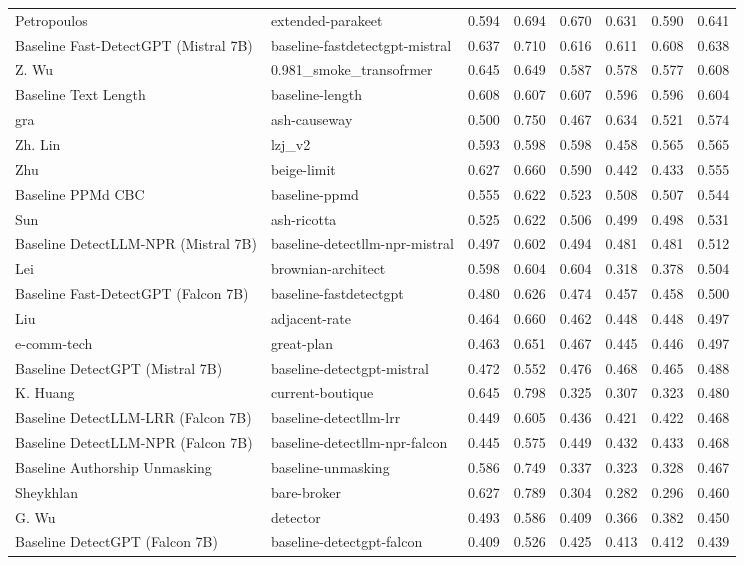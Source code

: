 \begin{tabular}{llrrrrrr}
Petropoulos & extended-parakeet & 0.594 & 0.694 & 0.670 & 0.631 & 0.590 & 0.641 \\
Baseline Fast-DetectGPT (Mistral 7B) & baseline-fastdetectgpt-mistral & 0.637 & 0.710 & 0.616 & 0.611 & 0.608 & 0.638 \\
Z. Wu & 0.981_smoke_transofrmer & 0.645 & 0.649 & 0.587 & 0.578 & 0.577 & 0.608 \\
Baseline Text Length & baseline-length & 0.608 & 0.607 & 0.607 & 0.596 & 0.596 & 0.604 \\
gra & ash-causeway & 0.500 & 0.750 & 0.467 & 0.634 & 0.521 & 0.574 \\
Zh. Lin & lzj_v2 & 0.593 & 0.598 & 0.598 & 0.458 & 0.565 & 0.565 \\
Zhu & beige-limit & 0.627 & 0.660 & 0.590 & 0.442 & 0.433 & 0.555 \\
Baseline PPMd CBC & baseline-ppmd & 0.555 & 0.622 & 0.523 & 0.508 & 0.507 & 0.544 \\
Sun & ash-ricotta & 0.525 & 0.622 & 0.506 & 0.499 & 0.498 & 0.531 \\
Baseline DetectLLM-NPR (Mistral 7B) & baseline-detectllm-npr-mistral & 0.497 & 0.602 & 0.494 & 0.481 & 0.481 & 0.512 \\
Lei & brownian-architect & 0.598 & 0.604 & 0.604 & 0.318 & 0.378 & 0.504 \\
Baseline Fast-DetectGPT (Falcon 7B) & baseline-fastdetectgpt & 0.480 & 0.626 & 0.474 & 0.457 & 0.458 & 0.500 \\
Liu & adjacent-rate & 0.464 & 0.660 & 0.462 & 0.448 & 0.448 & 0.497 \\
e-comm-tech & great-plan & 0.463 & 0.651 & 0.467 & 0.445 & 0.446 & 0.497 \\
Baseline DetectGPT (Mistral 7B) & baseline-detectgpt-mistral & 0.472 & 0.552 & 0.476 & 0.468 & 0.465 & 0.488 \\
K. Huang & current-boutique & 0.645 & 0.798 & 0.325 & 0.307 & 0.323 & 0.480 \\
Baseline DetectLLM-LRR (Falcon 7B) & baseline-detectllm-lrr & 0.449 & 0.605 & 0.436 & 0.421 & 0.422 & 0.468 \\
Baseline DetectLLM-NPR (Falcon 7B) & baseline-detectllm-npr-falcon & 0.445 & 0.575 & 0.449 & 0.432 & 0.433 & 0.468 \\
Baseline Authorship Unmasking & baseline-unmasking & 0.586 & 0.749 & 0.337 & 0.323 & 0.328 & 0.467 \\
Sheykhlan & bare-broker & 0.627 & 0.789 & 0.304 & 0.282 & 0.296 & 0.460 \\
G. Wu & detector & 0.493 & 0.586 & 0.409 & 0.366 & 0.382 & 0.450 \\
Baseline DetectGPT (Falcon 7B) & baseline-detectgpt-falcon & 0.409 & 0.526 & 0.425 & 0.413 & 0.412 & 0.439 \\
\bottomrule
\end{tabular}
